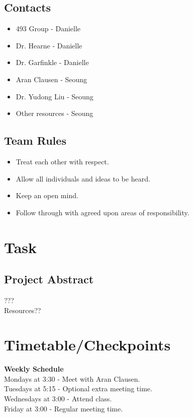\documentclass[11pt]{article}
\begin{document}
\subsection{Contacts}
\begin{itemize}
	\item 493 Group - Danielle
	\item Dr. Hearne - Danielle
	\item Dr. Garfinkle - Danielle
	\item Aran Clausen - Seoung
	\item Dr. Yudong Liu - Seoung
	\item Other resources - Seoung
\end{itemize}
    
\subsection{Team Rules}
\begin{itemize}
	\item Treat each other with respect.
	\item Allow all individuals and ideas to be heard.
	\item Keep an open mind.
	\item Follow through with agreed upon areas of responsibility.
\end{itemize}

\section{Task}
\subsection{Project Abstract}
???\\
Resources??

\section{Timetable/Checkpoints}
\textbf{Weekly Schedule}\\
Mondays at 3:30 - Meet with Aran Clausen.\\
Tuesdays at 5:15 - Optional extra meeting time.\\
Wednesdays at 3:00 - Attend class.\\
Friday at 3:00 - Regular meeting time.\\
\end{document}
